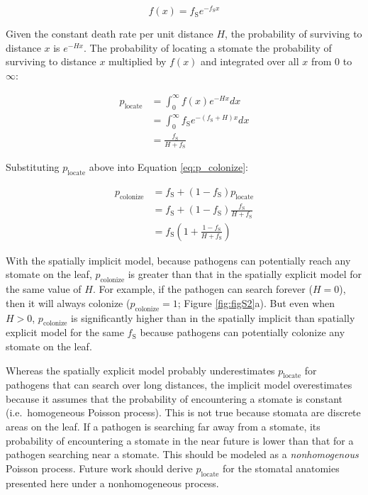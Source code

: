 \documentclass[utf8]{frontiersSCNS}
\newcommand{\fs}{$f_\text{S}$}
\begin{document}
\begin{equation*}
  f(x) = f_\text{S} e ^ {-f_\text{S} x}
\end{equation*}

Given the constant death rate per unit distance \(H\), the probability
of surviving to distance \(x\) is \(e^{-H x}\). The probability of
locating a stomate the probability of surviving to distance \(x\)
multiplied by \(f(x)\) and integrated over all \(x\) from 0 to
\(\infty\):

\begin{align*}
  p_\text{locate} & = \int_0^\infty f(x) e^{-Hx} dx \\
                  & = \int_0^\infty f_\text{S} e^{-(f_\text{S} + H)x} dx \\
                  & = \frac{f_\text{S}}{H + f_\text{S}}
\end{align*}

Substituting \(p_\text{locate}\) above into Equation
\ref{eq:p_colonize}:

\begin{align*}
  p_\text{colonize} & = f_\text{S} + (1 - f_\text{S}) p_\text{locate} \\
                    & = f_\text{S} + (1 - f_\text{S}) \frac{f_\text{S}}{H + f_\text{S}} \\
                    & = f_\text{S} (1 + \frac{1 - f_\text{S}}{H + f_\text{S}})
\end{align*}

With the spatially implicit model, because pathogens can potentially
reach any stomate on the leaf, \(p_\text{colonize}\) is greater than
that in the spatially explicit model for the same value of \(H\). For
example, if the pathogen can search forever (\(H = 0\)), then it will
always colonize (\(p_\text{colonize} = 1\); Figure \ref{fig:figS2}a).
But even when \(H > 0\), \(p_\text{colonize}\) is significantly higher
than in the spatially implicit than spatially explicit model for the
same \fs{} because pathogens can potentially colonize any stomate on the
leaf.

Whereas the spatially explicit model probably underestimates
\(p_\text{locate}\) for pathogens that can search over long distances,
the implicit model overestimates because it assumes that the probability
of encountering a stomate is constant (i.e.~homogeneous Poisson
process). This is not true because stomata are discrete areas on the
leaf. If a pathogen is searching far away from a stomate, its
probability of encountering a stomate in the near future is lower than
that for a pathogen searching near a stomate. This should be modeled as
a \emph{nonhomogenous} Poisson process. Future work should derive
\(p_\text{locate}\) for the stomatal anatomies presented here under a
nonhomogeneous process.
\end{document}
